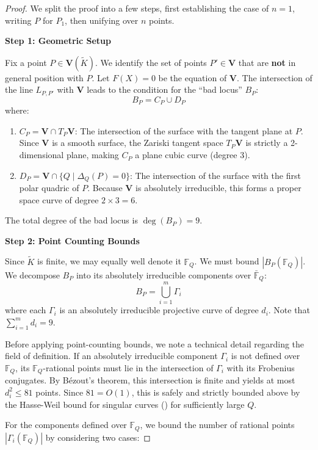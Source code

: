 \documentclass[11pt]{article}
\theoremstyle{definition}
\newcommand{\FF}{\mathbb{F}}
\newcommand{\Kfield}{\tilde{K}}
\newcommand{\V}{\mathbf{V}}
\begin{document}
\begin{proof}
We split the proof into a few steps, first establishing the case of $n = 1$, writing $P$ for $P_1$, then unifying over $n$ points.

\vspace{0.5em}
\noindent\textbf{Step 1: Geometric Setup}

Fix a point $P \in \V(\Kfield)$. We identify the set of points $P' \in \V$ that are \textbf{not} in general position with $P$. Let $F(X)=0$ be the equation of $\V$. The intersection of the line $L_{P,P'}$ with $\V$ leads to the condition for the ``bad locus'' $B_P$:
\[ B_P = C_P \cup D_P \]
where:
\begin{enumerate}
    \item $C_P = \V \cap T_P\V$: The intersection of the surface with the tangent plane at $P$. Since $\V$ is a smooth surface, the Zariski tangent space $T_P\V$ is strictly a 2-dimensional plane, making $C_P$ a plane cubic curve (degree 3).
    \item $D_P = \V \cap \{Q \mid \Delta_Q(P)=0\}$: The intersection of the surface with the first polar quadric of $P$. Because $\V$ is absolutely irreducible, this forms a proper space curve of degree $2 \times 3 = 6$.
\end{enumerate}
The total degree of the bad locus is $\deg(B_P) = 9$.

\vspace{0.5em}
\noindent\textbf{Step 2: Point Counting Bounds}

Since $\Kfield$ is finite, we may equally well denote it $\FF_Q$. We must bound $|B_P(\FF_Q)|$.
We decompose $B_P$ into its absolutely irreducible components over $\bar{\FF}_Q$:
\[ B_P = \bigcup_{i=1}^m \Gamma_i \]
where each $\Gamma_i$ is an absolutely irreducible projective curve of degree $d_i$.
Note that $\sum_{i=1}^m d_i = 9$.

Before applying point-counting bounds, we note a technical detail regarding the field of definition. If an absolutely irreducible component $\Gamma_i$ is not defined over $\FF_Q$, its $\FF_Q$-rational points must lie in the intersection of $\Gamma_i$ with its Frobenius conjugates. By B\'ezout's theorem, this intersection is finite and yields at most $d_i^2 \le 81$ points. Since $81 = O(1)$, this is safely and strictly bounded above by the Hasse-Weil bound for singular curves () for sufficiently large $Q$. 

For the components defined over $\FF_Q$, we bound the number of rational points $|\Gamma_i(\FF_Q)|$ by considering two cases:


\end{proof}
\end{document}

